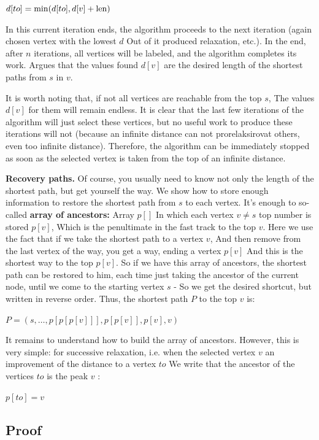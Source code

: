 $d [to] = \min (d [to], d [v] + {\rm len})$

In this current iteration ends, the algorithm proceeds to the next iteration (again chosen vertex with the lowest $d$ Out of it produced relaxation, etc.). In the end, after $n$ iterations, all vertices will be labeled, and the algorithm completes its work. Argues that the values ​​found $d [v]$ are the desired length of the shortest paths from $s$ in $v$.

It is worth noting that, if not all vertices are reachable from the top $s$, The values $d [v]$ for them will remain endless. It is clear that the last few iterations of the algorithm will just select these vertices, but no useful work to produce these iterations will not (because an infinite distance can not prorelaksirovat others, even too infinite distance). Therefore, the algorithm can be immediately stopped as soon as the selected vertex is taken from the top of an infinite distance.

\textbf{Recovery paths.} Of course, you usually need to know not only the length of the shortest path, but get yourself the way. We show how to store enough information to restore the shortest path from $s$ to each vertex. It's enough to so-called \textbf{array of ancestors:} Array $p []$ In which each vertex $v \ne s$ top number is stored $p [v]$, Which is the penultimate in the fast track to the top $v$. Here we use the fact that if we take the shortest path to a vertex $v$, And then remove from the last vertex of the way, you get a way, ending a vertex $p [v]$ And this is the shortest way to the top $p [v]$. So if we have this array of ancestors, the shortest path can be restored to him, each time just taking the ancestor of the current node, until we come to the starting vertex $s$ - So we get the desired shortcut, but written in reverse order. Thus, the shortest path $P$ to the top $v$ is:

$P = (s, \ldots, p [p [p [v]]], p [p [v]], p [v], v)$

It remains to understand how to build the array of ancestors. However, this is very simple: for successive relaxation, i.e. when the selected vertex $v$ an improvement of the distance to a vertex $to$ We write that the ancestor of the vertices $to$ is the peak $v$ :

$p [to] = v$

\subsection{ Proof }

